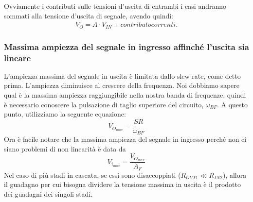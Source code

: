 \documentclass[a4paper,twocolumn,notitlepage]{book}
\begin{document}
	Ovviamente i contributi sulle tensioni d'uscita di entrambi i casi andranno sommati alla tensione d'uscita di segnale, avendo quindi:
	\begin{align*}
		V_O=A \cdot V_{IN} \pm contributo correnti.
	\end{align*}
	
	\subsubsection*{Massima ampiezza del segnale in ingresso affinché l'uscita sia lineare}
	L'ampiezza massima del segnale in uscita è limitata dallo slew-rate, come detto prima. L'ampiezza diminuisce al crescere della frequenza. Noi dobbiamo sapere qual è la massima ampiezza raggiungibile nella nostra banda di frequenze, quindi è necessario conoscere la pulsazione di taglio superiore del circuito, $\omega_{BF}$.\newline
	A questo punto, utilizziamo la seguente equazione:
	\begin{equation}
		V_{O_{max}}=\frac{SR}{\omega_{BF}}
	\end{equation}
	Ora è facile notare che la massima ampiezza del segnale in ingresso perché non ci siano problemi di non linearità è data da
	\begin{equation}
		V_{i_{max}}=\frac{V_{O_{max}}}{A_F}
	\end{equation}
	Nel caso di più stadi in cascata, se essi sono disaccoppiati ($R_{OUT1} \ll R_{IN2}$), allora il guadagno per cui bisogna dividere la tensione massima in uscita è il prodotto dei guadagni dei singoli stadi.
	
	
\end{document}
